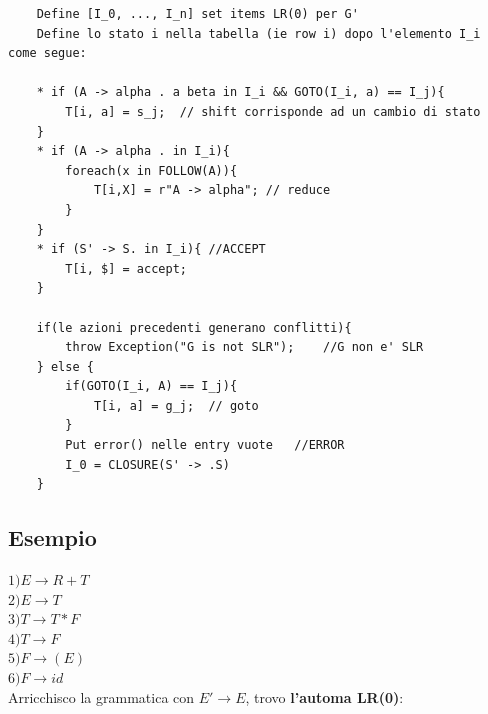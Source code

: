 \begin{lstlisting}
    Define [I_0, ..., I_n] set items LR(0) per G'
    Define lo stato i nella tabella (ie row i) dopo l'elemento I_i come segue:

    * if (A -> alpha . a beta in I_i && GOTO(I_i, a) == I_j){
        T[i, a] = s_j;  // shift corrisponde ad un cambio di stato
    }
    * if (A -> alpha . in I_i){
        foreach(x in FOLLOW(A)){
            T[i,X] = r"A -> alpha"; // reduce
        }
    }
    * if (S' -> S. in I_i){ //ACCEPT
        T[i, $] = accept;
    }

    if(le azioni precedenti generano conflitti){
        throw Exception("G is not SLR");    //G non e' SLR
    } else {
        if(GOTO(I_i, A) == I_j){
            T[i, a] = g_j;  // goto
        }
        Put error() nelle entry vuote   //ERROR
        I_0 = CLOSURE(S' -> .S)
    }
\end{lstlisting}

\subsection{Esempio}
$1) E \rightarrow R + T$ \\
$2) E \rightarrow T$ \\
$3) T \rightarrow T * F$ \\
$4) T \rightarrow F$ \\
$5) F \rightarrow (E)$ \\
$6) F \rightarrow id$ \\

Arricchisco la grammatica con $E' \rightarrow E$, trovo \textbf{l'automa LR(0)}:

